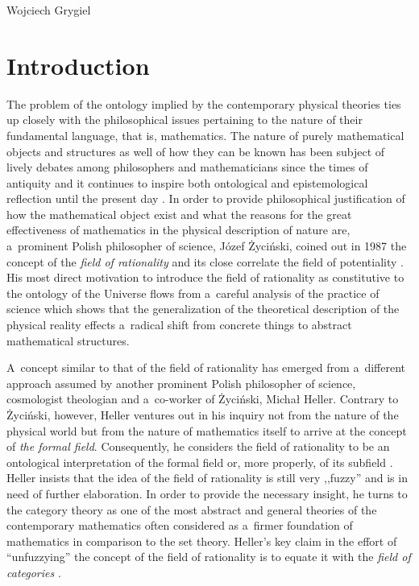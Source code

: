 \begin{artengenv}{Wojciech Grygiel}
\section{Introduction}
\lettrine[loversize=0.13,lines=2,lraise=-0.01,nindent=0em,findent=0.2pt]%
{T}{}he problem of the ontology implied by the contemporary physical theories ties up closely with the philosophical issues pertaining to the nature of their fundamental language, that is, mathematics. The nature of purely mathematical objects and structures as well of how they can be known has been subject of lively debates among philosophers and mathematicians since the times of antiquity and it continues to inspire both ontological and epistemological reflection until the present day
\parencite[e.g.][]{shapiro_thinking_2000}. %
 In order to provide philosophical justification of how the mathematical object exist and what the reasons for the great effectiveness of mathematics in the physical description of nature are, a~prominent Polish philosopher of science, Józef Życiński, coined out in 1987 the concept of the \textit{field of rationality} and its close correlate the field of potentiality 
\parencites[][]{zycinski_filozoficzne_1987}[][]{zycinski_teizm_1988}. %
 His most direct motivation to introduce the field of rationality as constitutive to the ontology of the Universe flows from a~careful analysis of the practice of science which shows that the generalization of the theoretical description of the physical reality effects a~radical shift from concrete things to abstract mathematical structures.

A~concept similar to that of the field of rationality has emerged from a~different approach assumed by another prominent Polish philosopher of science, cosmologist theologian and a~co-worker of Życiński, Michał Heller. Contrary to Życiński, however, Heller ventures out in his inquiry not from the nature of the physical world but from the nature of mathematics itself to arrive at the concept of \textit{the formal field}. Consequently, he considers the field of rationality to be an ontological interpretation of the formal field or, more properly, of its subfield
\parencite[][p.442]{heller_field_2014}. %
 Heller insists that the idea of the field of rationality is still very ,,fuzzy'' and is in need of further elaboration. In order to provide the necessary insight, he turns to the category theory as one of the most abstract and general theories of the contemporary mathematics often considered as a~firmer foundation of mathematics in comparison to the set theory. Heller's key claim in the effort of ``unfuzzying'' the concept of the field of rationality is to equate it with the \textit{field of categories} 
\parencite[][p.453]{heller_field_2014}.%



\end{artengenv}
